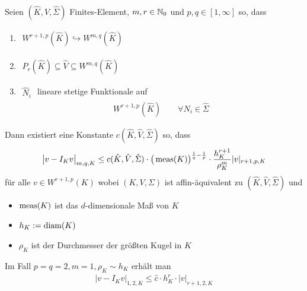 \begin{theorem}\label{theorem4.14}
Seien $(\hat{K},\hat{V},\hat{\Sigma})$ Finites-Element, $m,r\in\mathbb{N}_0$ und $p,q\in[1,\infty]$ so, dass
\begin{enumerate}[label=(\roman*)]
\item $\begin{aligned}
W^{r+1,p}(\hat{K})\hookrightarrow W^{m,q}(\hat{K})
\end{aligned}$
\item $\begin{aligned}
P_r(\hat{K})\subseteq\hat{V}\subseteq W^{m,q}(\hat{K})
\end{aligned}$
\item $\begin{aligned}
\hat{N}_i
\end{aligned}$ lineare stetige Funktionale auf
\begin{align*}
W^{r+1,p}(\hat{K})\qquad\forall\hat{N}_i\in\hat{\Sigma}
\end{align*}
\end{enumerate}
Dann existiert eine Konstante $c(\hat{K},\hat{V},\hat{\Sigma})$ so, dass
\begin{align*}
\big| v-I_K v\big|_{m,q,K}\leq c(\hat{K},\hat{V},\hat{\Sigma})\cdot\big(\operatorname{meas}(K)\big)^{\frac{1}{q}-\frac{1}{p}}\cdot\frac{h_K^{r+1}}{\rho_K^m}|v|_{r+1,p,K}
\end{align*}
für alle $v\in W^{r+1,p}(K)$ wobei $(K,V,\Sigma	)$ ist affin-äquivalent zu $(\hat{K},\hat{V},\hat{\Sigma})$ und
\begin{itemize}
\item $\operatorname{meas}(K)$ ist das $d$-dimensionale Maß von $K$
\item $h_K:=\operatorname{diam}(K)$
\item $\rho_K$ ist der Durchmesser der größten Kugel in $K$
\end{itemize}
Im Fall $p=q=2,m=1,\rho_K\sim h_K$ erhält man
\begin{align*}
\big|v-I_K v\big|_{1,2,K}\leq \hat{c}\cdot h_K^r\cdot |v|_{r+1,2,K}
\end{align*}
\end{theorem}
